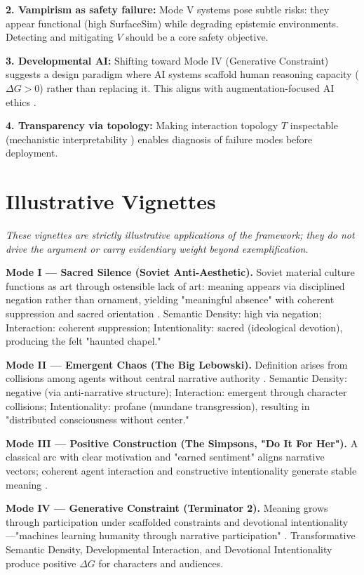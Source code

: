\documentclass[12pt]{article}
\begin{document}
\textbf{2. Vampirism as safety failure:} Mode V systems pose subtle risks: they appear functional (high SurfaceSim) while degrading epistemic environments. Detecting and mitigating $V$ should be a core safety objective.

\textbf{3. Developmental AI:} Shifting toward Mode IV (Generative Constraint) suggests a design paradigm where AI systems scaffold human reasoning capacity ($\Delta G > 0$) rather than replacing it. This aligns with augmentation-focused AI ethics \citep{brynjolfsson2014second}.

\textbf{4. Transparency via topology:} Making interaction topology $T$ inspectable (mechanistic interpretability \citep{olah2020zoom}) enables diagnosis of failure modes before deployment.

\section{Illustrative Vignettes}
\label{sec:vignettes}

\textit{These vignettes are strictly illustrative applications of the framework; they do not drive the argument or carry evidentiary weight beyond exemplification.}

\textbf{Mode I — Sacred Silence (Soviet Anti-Aesthetic).} Soviet material culture functions as art through ostensible lack of art: meaning appears via disciplined negation rather than ornament, yielding "meaningful absence" with coherent suppression and sacred orientation \citep{groys1992total}. Semantic Density: high via negation; Interaction: coherent suppression; Intentionality: sacred (ideological devotion), producing the felt "haunted chapel."

\textbf{Mode II — Emergent Chaos (The Big Lebowski).} Definition arises from collisions among agents without central narrative authority \citep{coen1998lebowski}. Semantic Density: negative (via anti-narrative structure); Interaction: emergent through character collisions; Intentionality: profane (mundane transgression), resulting in "distributed consciousness without center."

\textbf{Mode III — Positive Construction (The Simpsons, "Do It For Her").} A classical arc with clear motivation and "earned sentiment" aligns narrative vectors; coherent agent interaction and constructive intentionality generate stable meaning \citep{groening1993simpsons}.

\textbf{Mode IV — Generative Constraint (Terminator 2).} Meaning grows through participation under scaffolded constraints and devotional intentionality—"machines learning humanity through narrative participation" \citep{cameron1991terminator}. Transformative Semantic Density, Developmental Interaction, and Devotional Intentionality produce positive $\Delta G$ for characters and audiences.
\end{document}
